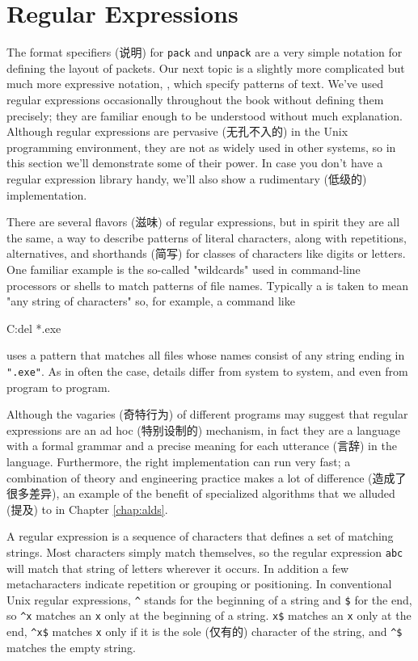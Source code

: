 \section{Regular Expressions}
\label{sec:regular_expressions}

The format specifiers (说明) for \verb'pack' and \verb'unpack' are a very
simple notation for defining the layout of packets. Our next topic is a
slightly more complicated but much more expressive notation,
, which specify patterns of text.
We've used regular expressions occasionally throughout the book without
defining them precisely; they are familiar enough to be understood without
much explanation.  Although regular expressions are pervasive (无孔不入的)
in the Unix programming environment, they are not as widely used in other
systems, so in this section we'll demonstrate some of their power. In case
you don't have a regular expression library handy, we'll also show a
rudimentary (低级的) implementation.

There are several flavors (滋味) of regular expressions, but in spirit they
are all the same, a way to describe patterns of literal characters, along
with repetitions, alternatives, and shorthands (简写) for classes of
characters like digits or letters. One familiar example is the so-called
"wildcards" used in command-line processors or shells to match patterns of
file names. Typically a is taken to mean "any string of characters" so, for
example, a command like
\begin{wellcode}
    C:\>del *.exe
\end{wellcode}
uses a pattern that matches all files whose names consist of any string
ending in \verb'".exe"'. As in often the case, details differ from system
to system, and even from program to program.

Although the vagaries (奇特行为) of different programs may suggest that
regular expressions are an ad hoc (特别设制的) mechanism, in fact they are
a language with a formal grammar and a precise meaning for each utterance
(言辞) in the language. Furthermore, the right implementation can run very
fast; a combination of theory and engineering practice makes a lot of
difference (造成了很多差异), an example of the benefit of specialized
algorithms that we alluded (提及) to in Chapter \ref{chap:alds}.

A regular expression is a sequence of characters that defines a set of
matching strings. Most characters simply match themselves, so the regular
expression \verb'abc' will match that string of letters wherever it occurs.
In addition a few metacharacters indicate repetition or grouping or
positioning. In conventional Unix regular expressions, \verb'^' stands for
the beginning of a string and \verb'$' for the end, so \verb'^x' matches an
\verb'x' only at the beginning of a string. \verb'x$' matches an \verb'x'
only at the end, \verb'^x$' matches \verb'x' only if it is the sole
(仅有的) character of the string, and \verb'^$' matches the empty string.

